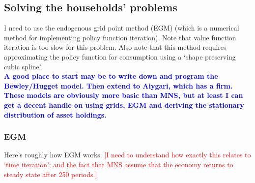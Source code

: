\documentclass[12pt]{article}
\begin{document}
\subsection{Solving the households' problems}
I need to use the endogenous grid point method (EGM) (which is a numerical method for implementing policy function iteration). Note that value function iteration is too slow for this problem. Also note that this method requires approximating the policy function for consumption using a `shape preserving cubic spline'.\\

\textbf{\textcolor{blue}{A good place to start may be to write down and program the Bewley/Hugget model. Then extend to Aiygari, which has a firm. These models are obviously more basic than MNS, but at least I can get a decent handle on using grids, EGM and deriving the stationary distribution of asset holdings.}}

\subsubsection{EGM}
Here's roughly how EGM works. \textcolor{red}{[I need to understand how exactly this relates to `time iteration'; and the fact that MNS assume that the economy returns to steady state after 250 periods.]} \\
\end{document}
